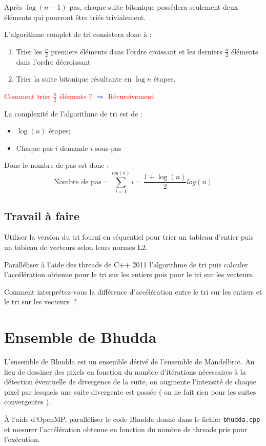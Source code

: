 \documentclass[11pt,a4paper]{article}
\begin{document}
Après $\log(n-1)$ pas, chaque suite bitonique possédera seulement
deux éléments qui pourront être triés trivialement.

L'algorithme complet de tri consistera donc à :
\begin{enumerate}
\item Trier les $\frac{n}{2}$ premiers éléments dans l'ordre croissant et les
derniers $\frac{n}{2}$ éléments dans l'ordre décroissant
\item Trier la suite bitonique résultante en $\log{n}$ étapes.
\end{enumerate}

\textcolor{red}{Comment trier $\frac{n}{2}$ éléments ?} {\Large\textcolor{blue}{$\Rightarrow$}} \textcolor{red}{Récursivement}

La complexité de l'algorithme de tri est de :
\begin{itemize}
\item $\log(n)$ étapes;
\item Chaque pas $i$ demande $i$ sous-pas
\end{itemize}
Donc le nombre de pas est donc :
\[
\mbox{Nombre de pas} = \sum_{i=1}^{log(n)} i = \frac{1+\log(n)}{2}log(n)
\]

\subsection{Travail à faire}

Utiliser la version du tri fourni en séquentiel pour trier un tableau d'entier
puis un tableau de vecteurs selon leurs normes L2.

Paralléliser à l'aide des threads de C++ 2011 l'algorithme de tri puis calculer
l'accélération obtenue pour le tri sur les entiers puis pour le tri sur les vecteurs.

Comment interprétez-vous la différence d'accélération entre le tri sur les entiers et
le tri  sur les vecteurs~?

\section{Ensemble de Bhudda}

L'ensemble de Bhudda est un ensemble dérivé de l'ensemble de Mandelbrot. Au lieu de dessiner des pixels en fonction du nombre d'itérations nécessaires à la détection éventuelle de divergence de la suite, on augmente l'intensité de chaque pixel par lesquels une suite divergente est passée ( on ne fait rien pour les suites convergentes ).

\`A l'aide d'OpenMP, paralléliser le code Bhudda donné dans le fichier \texttt{bhudda.cpp} et mesurer
l'accélération obtenue en fonction du nombre de threads pris pour l'exécution.
\end{document}
